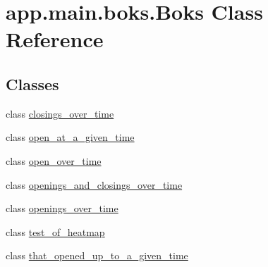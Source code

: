 \hypertarget{classapp_1_1main_1_1boks_1_1Boks}{}\section{app.\+main.\+boks.\+Boks Class Reference}
\label{classapp_1_1main_1_1boks_1_1Boks}
\subsection*{Classes}
\begin{DoxyCompactItemize}
\item 
class \mbox{\hyperlink{classapp_1_1main_1_1boks_1_1Boks_1_1closings__over__time}{closings\+\_\+over\+\_\+time}}
\item 
class \mbox{\hyperlink{classapp_1_1main_1_1boks_1_1Boks_1_1open__at__a__given__time}{open\+\_\+at\+\_\+a\+\_\+given\+\_\+time}}
\item 
class \mbox{\hyperlink{classapp_1_1main_1_1boks_1_1Boks_1_1open__over__time}{open\+\_\+over\+\_\+time}}
\item 
class \mbox{\hyperlink{classapp_1_1main_1_1boks_1_1Boks_1_1openings__and__closings__over__time}{openings\+\_\+and\+\_\+closings\+\_\+over\+\_\+time}}
\item 
class \mbox{\hyperlink{classapp_1_1main_1_1boks_1_1Boks_1_1openings__over__time}{openings\+\_\+over\+\_\+time}}
\item 
class \mbox{\hyperlink{classapp_1_1main_1_1boks_1_1Boks_1_1test__of__heatmap}{test\+\_\+of\+\_\+heatmap}}
\item 
class \mbox{\hyperlink{classapp_1_1main_1_1boks_1_1Boks_1_1that__opened__up__to__a__given__time}{that\+\_\+opened\+\_\+up\+\_\+to\+\_\+a\+\_\+given\+\_\+time}}
\end{DoxyCompactItemize}
